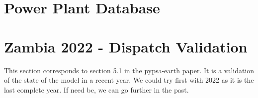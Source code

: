 \documentclass{article}
\begin{document}
\section{Power Plant Database}
\label{SEC:PowerPlantDatabase}




\section{Zambia 2022 - Dispatch Validation}
\label{SEC:Zambia2022-DispatchValidation}

This section corresponds to section 5.1 in the pypsa-earth paper. It is a validation of the state of the model in a recent year. We could try first with 2022 as it is the last complete year. If need be, we can go further in the past.












\printbibliography
\end{document}
